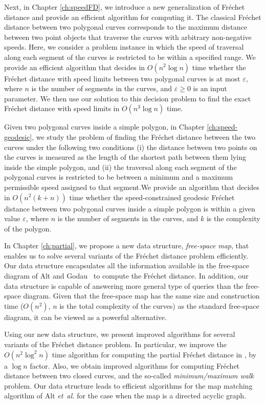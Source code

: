 \documentclass[12pt]{dalthesis}
\newcommand{\gee}{\geqslant}
\newcommand{\eps}{\varepsilon}
\newcommand{\etal}{{\em et~al.\/}}
\newcommand{\Frechet}{Fr\'echet }
\begin{document}
Next, in Chapter \ref{ch:speedFD},
we introduce a new generalization of 
\Frechet distance and provide an efficient algorithm for computing it. 
The classical \Frechet distance between two polygonal curves corresponds to the 
maximum distance between two point objects that traverse the curves with arbitrary non-negative speeds.
Here, we consider a problem instance in which the speed of traversal 
along each segment of the curves is restricted to be within a specified range. 
We provide an efficient algorithm that  
decides in $O(n^2\log n)$ time whether the \Frechet distance with speed limits
between two polygonal curves is at most $\eps$,
where $n$ is the number of segments in the curves, and
$\eps \gee 0$ is an input parameter. 
We then use our solution to this decision problem 
to find the exact \Frechet distance with speed limits
in $O(n^3 \log n)$ time. 






Given two polygonal curves inside a simple polygon,
in Chapter \ref{ch:speed-geodesic}, we study the problem of finding the \Frechet distance between the two curves
under the following two conditions
(i) the distance between two points on the curves is measured as the length of the shortest path
between them lying inside the simple polygon, and 
(ii) the traversal along each segment of the polygonal curves 
is restricted to be between a minimum and a maximum permissible speed
assigned to that segment.We provide an algorithm that decides in $O(n^2 (k + n))$ time 
whether the speed-constrained geodesic \Frechet distance between two polygonal curves inside a 
simple polygon is within a given value $\eps$, 
where $n$ is the number of segments in the curves, and $k$ is the complexity of the polygon. 


In Chapter \ref{ch:partial}, 
we propose a new data structure, \emph{free-space map}, 
that enables us to solve several variants of the \Frechet distance problem efficiently.
Our data structure encapsulates all the
information available in the 
free-space diagram of Alt and Godau~\cite{AltG95} to compute the
\Frechet distance. 
In addition, our data structure is capable of answering
more general type of queries than 
the free-space diagram. 
Given that the free-space map has the same size  and 
construction time 
($O(n^2)$, $n$ is the total complexity of the curves)
as the standard free-space diagram,
 it can be viewed as a powerful alternative.


Using our new data structure,
we present improved algorithms 
for several variants of
the \Frechet distance problem.
In particular, we improve the 
$O(n^2\log^2n)$ time algorithm 
for computing the partial \Frechet distance in \cite{AltG95}, 
by a $\log n$ factor. 
Also, we obtain improved algorithms 
for computing \Frechet distance between 
two closed curves, and the so-called \emph{minimum/maximum walk} problem. 
Our data structure leads to efficient 
algorithms for
the map matching algorithm of Alt \etal 
\cite{AltERW03a}
for the case when the map is a directed acyclic graph. 
\end{document}
